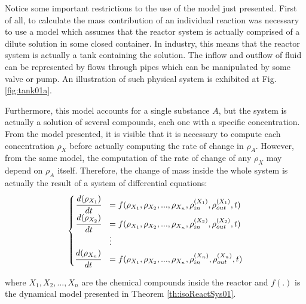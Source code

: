 \documentclass[a4paper,11pt]{book}
\numberwithin{figure}{chapter}
\numberwithin{equation}{chapter}
\numberwithin{table}{chapter}
\theoremstyle{definition}
\begin{document}
Notice some important restrictions to the use of the model just presented. First of all, to calculate the mass contribution of an individual reaction was necessary to use a model which assumes that the reactor system is actually comprised of a dilute solution in some closed container. In industry, this means that the reactor system is actually a tank containing the solution. The inflow and outflow of fluid can be represented by flows through pipes which can be manipulated by some valve or pump. An illustration of such physical system is exhibited at Fig. \ref{fig:tank01a}.

Furthermore, this model accounts for a single substance $A$, but the system is actually a solution of several compounds, each one with a specific concentration. From the model presented, it is visible that it is necessary to compute each concentration $\rho_X$ before actually computing the rate of change in $\rho_A$. However, from the same model, the computation of the rate of change of any $\rho_X$ may depend on $\rho_A$ itself. Therefore, the change of mass inside the whole system is actually the result of a system of differential equations:
\begin{align}	\label{eq:isoSys01}
\begin{cases}
	\hfill \cfrac{d (\rho_{X_1})}{dt} &= f(\rho_{X_1}, \rho_{X_2}, ..., \rho_{X_n}, \rho_{in}^{(X_1)}, \rho_{out}^{(X_1)}, t) \\
	\hfill \cfrac{d (\rho_{X_2})}{dt} &= f(\rho_{X_1}, \rho_{X_2}, ..., \rho_{X_n}, \rho_{in}^{(X_2)}, \rho_{out}^{(X_2)}, t) \\
	& \vdots   \\
	\hfill \cfrac{d (\rho_{X_n})}{dt} &= f(\rho_{X_1}, \rho_{X_2}, ..., \rho_{X_n}, \rho_{in}^{(X_n)}, \rho_{out}^{(X_n)}, t)
\end{cases}
\end{align}

\noindent where $X_1, X_2, ..., X_n$ are the chemical compounds inside the reactor and $f(.)$ is the dynamical model presented in Theorem \ref{th:isoReactSys01}.
\end{document}

